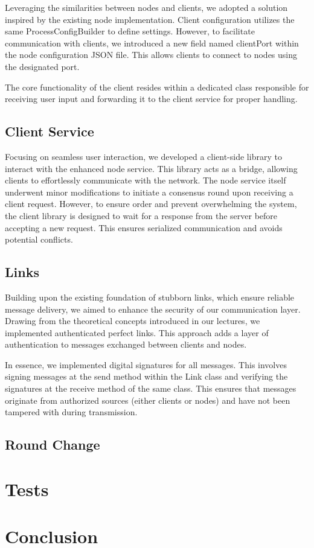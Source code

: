 \documentclass[12pt]{article}
\begin{document}
Leveraging the similarities between nodes and clients, we adopted a solution inspired by the existing node implementation.  Client configuration utilizes the same ProcessConfigBuilder to define settings.  However, to facilitate communication with clients, we introduced a new field named clientPort within the node configuration JSON file. This allows clients to connect to nodes using the designated port.

The core functionality of the client resides within a dedicated class responsible for receiving user input and forwarding it to the client service for proper handling.

\subsection{Client Service}

Focusing on seamless user interaction, we developed a client-side library to interact with the enhanced node service. This library acts as a bridge, allowing clients to effortlessly communicate with the network.  The node service itself underwent minor modifications to initiate a consensus round upon receiving a client request.  However, to ensure order and prevent overwhelming the system, the client library is designed to wait for a response from the server before accepting a new request. This ensures serialized communication and avoids potential conflicts.

\subsection{Links}
Building upon the existing foundation of stubborn links, which ensure reliable message delivery, we aimed to enhance the security of our communication layer. Drawing from the theoretical concepts introduced in our lectures, we implemented authenticated perfect links. This approach adds a layer of authentication to messages exchanged between clients and nodes.

In essence, we implemented digital signatures for all messages. This involves signing messages at the send method within the Link class and verifying the signatures at the receive method of the same class. This ensures that messages originate from authorized sources (either clients or nodes) and have not been tampered with during transmission.

\subsection{Round Change}

\section{Tests}

\section{Conclusion}

\label{LastPage}
\end{document}

